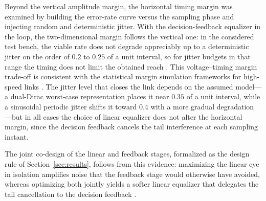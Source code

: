 \documentclass[twocolumn]{USG}
\begin{document}
Beyond the vertical amplitude margin, the horizontal timing margin was
examined by building the error-rate curve versus the sampling phase and
injecting random and deterministic jitter. With the decision-feedback
equalizer in the loop, the two-dimensional margin follows the vertical one:
in the considered test bench, the viable rate does not degrade appreciably up
to a deterministic jitter on the order of $0.2$ to $0.25$ of a unit interval,
so for jitter budgets in that range the timing does not limit the obtained
reach \cite{7202856,10584882}. This voltage--timing margin trade-off is
consistent with the statistical margin simulation frameworks for high-speed
links \cite{4509472}. The jitter level that closes the link depends on the
assumed model---a dual-Dirac worst-case representation places it near $0.35$
of a unit interval, while a sinusoidal periodic jitter shifts it toward $0.4$
with a more gradual degradation \cite{805809,7571656}---but in all cases the
choice of linear equalizer does not alter the horizontal margin, since the
decision feedback cancels the tail interference at each sampling instant.

The joint co-design of the linear and feedback stages, formalized as the
design rule of Section~\ref{sec:results}, follows from this evidence:
maximizing the linear eye in isolation amplifies noise that the feedback
stage would otherwise have avoided, whereas optimizing both jointly yields a
softer linear equalizer that delegates the tail cancellation to the decision
feedback \cite{11169790,11346689}.
\end{document}
